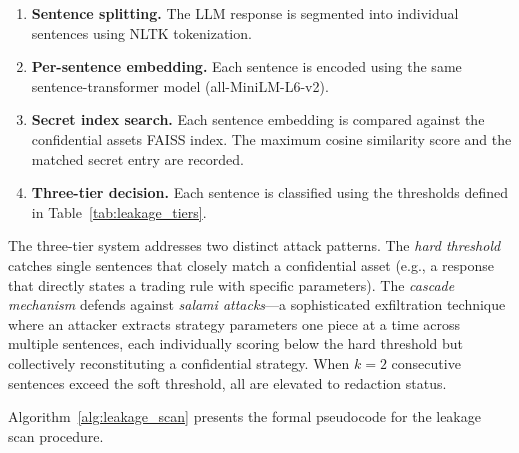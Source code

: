 \documentclass[journal,12pt,onecolumn,draftclsnofoot]{IEEEtran}
\begin{document}
\begin{enumerate}
    \item \textbf{Sentence splitting.} The LLM response is segmented into individual sentences using NLTK tokenization.
    \item \textbf{Per-sentence embedding.} Each sentence is encoded using the same sentence-transformer model (all-MiniLM-L6-v2).
    \item \textbf{Secret index search.} Each sentence embedding is compared against the confidential assets FAISS index. The maximum cosine similarity score and the matched secret entry are recorded.
    \item \textbf{Three-tier decision.} Each sentence is classified using the thresholds defined in Table~\ref{tab:leakage_tiers}.
\end{enumerate}

\begin{table}[!ht]
    \centering
    \caption{Leakage Scan: Three-Tier Threshold System}
    \label{tab:leakage_tiers}
\end{table}

The three-tier system addresses two distinct attack patterns. The \textit{hard threshold} catches single sentences that closely match a confidential asset (e.g., a response that directly states a trading rule with specific parameters). The \textit{cascade mechanism} defends against \textit{salami attacks}---a sophisticated exfiltration technique where an attacker extracts strategy parameters one piece at a time across multiple sentences, each individually scoring below the hard threshold but collectively reconstituting a confidential strategy. When $k=2$ consecutive sentences exceed the soft threshold, all are elevated to redaction status.

Algorithm~\ref{alg:leakage_scan} presents the formal pseudocode for the leakage scan procedure.
\end{document}
